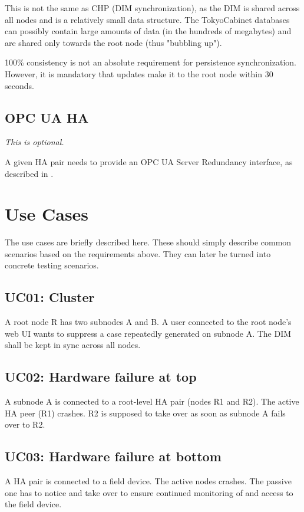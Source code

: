 This is not the same as \gls{CHP} (\gls{DIM} synchronization), as the DIM is shared across
all nodes and is a relatively small data structure. The TokyoCabinet databases
can possibly contain large amounts of data (in the hundreds of megabytes) and
are shared only towards the root node (thus "bubbling up").

100\% consistency is not an absolute requirement for persistence synchronization.
However, it is mandatory that updates make it to the root node within 30 seconds.

\subsection{OPC UA HA}
\emph{This is optional.}

A given \gls{HA} pair needs to provide an OPC UA Server Redundancy interface,
as described in \cite[6.4.2.4 Non-transparent Redundancy,
p.~96]{opc-ua:behavior:server-redundancy}.

\section{Use Cases}
The use cases are briefly described here. These should simply describe common
scenarios based on the requirements above. They can later be turned into
concrete testing scenarios.

\subsection{UC01: Cluster}
A root node R has two subnodes A and B. A user connected to the root node's web
UI wants to suppress a case repeatedly generated on subnode A. The DIM shall be
kept in sync across all nodes.

\subsection{UC02: Hardware failure at top}
A subnode A is connected to a root-level HA pair (nodes R1 and R2). The active
HA peer (R1) crashes. R2 is supposed to take over as soon as subnode A fails
over to R2.

\subsection{UC03: Hardware failure at bottom}
A HA pair is connected to a field device. The active nodes crashes. The passive
one has to notice and take over to ensure continued monitoring of and access to
the field device.

